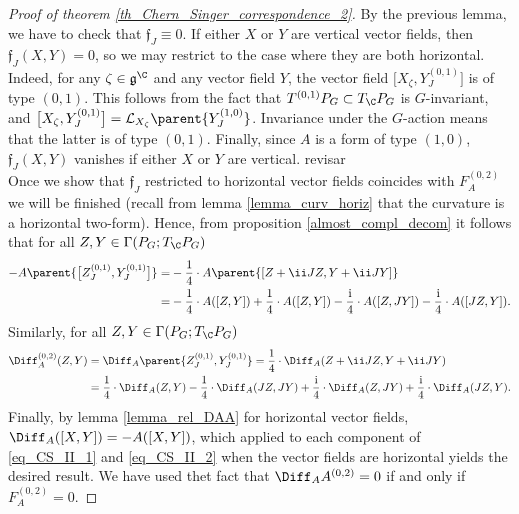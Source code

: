 \begin{proof}[\textit{Proof of theorem} \ref{th_Chern_Singer_correspondence_2}]
    By the previous lemma, we have to check that \(\mathfrak{f}_J \equiv 0\). If either \(X\) or \(Y\) are vertical vector fields, then \(\mathfrak{f}_J(X,Y)=0\), so we may restrict to the case where they are both horizontal. Indeed, for any \(\zeta \in \mathfrak{g}^\C\) and any vector field \(Y\), the vector field \(\big[X_{\zeta}, Y_J^{(0,1)}\big]\) is of type \((0,1)\). This follows from the fact that \(T^{(0,1)}P_G\subset T_\C P_G\) is \(G\)-invariant, and \(\big[X_{\zeta}, Y_J^{(0,1)}\big]=\mathcal{L}_{X_\zeta}\parent{Y_J^{(1,0)}}\). Invariance under the \(G\)-action means that the latter is of type \((0,1)\). Finally, since \(A\) is a form of type \((1,0)\), \(\mathfrak{f}_J(X,Y)\) vanishes if either \(X\) or \(Y\) are vertical. {\color{red} revisar }\\
    
    Once we show that \(\mathfrak{f}_J\) restricted to horizontal vector fields coincides with \(F_A^{(0,2)}\) we will be finished (recall from lemma \ref{lemma_curv_horiz} that the curvature is a horizontal two-form). Hence, from proposition \ref{almost_compl_decom} it follows that for all \(Z,Y \in \Gamma(P_G; T_\C P_G)\)
    \begin{equation} \label{eq_CS_II_1}
        \begin{split}
        -A\parent{\big[Z_J^{(0,1)}, Y_J^{(0,1)}\big]}  =& -\frac{1}{4}\cdot A\parent{[Z+\ii J Z, Y+\ii J Y ]} \\ 
        = & -\frac{1}{4}\cdot A([Z,Y])+\frac{1}{4}\cdot A([Z,Y]) - \frac{\mathrm{i}}{4}\cdot A([Z,JY]) - \frac{\mathrm{i}}{4} \cdot A([JZ, Y]).
        \end{split}
    \end{equation}
    Similarly, for all \(Z, Y \in \Gamma(P_G; T_\C P_G)\)
    \begin{equation} \label{eq_CS_II_2}
        \begin{split}
        \Diff_A^{(0,2)}(Z,Y) & = \Diff_A\parent{Z_J^{(0,1)}, Y_J^{(0,1)}}= \frac{1}{4}\cdot \Diff_A(Z+\ii J Z,Y+\ii JY) \\
        & = \frac{1}{4} \cdot \Diff_A(Z,Y)-\frac{1}{4} \cdot \Diff_A(JZ, JY) +\frac{\mathrm{i}}{4}\cdot \Diff_A(Z, JY) + \frac{\mathrm{i}}{4}\cdot \Diff_A(JZ, Y).
        \end{split}
    \end{equation}
    Finally, by lemma \ref{lemma_rel_DAA} for horizontal vector fields, \(\Diff_A([X,Y])=-A([X,Y])\), which applied to each component of \eqref{eq_CS_II_1} and \eqref{eq_CS_II_2} when the vector fields are horizontal yields the desired result. We have used thet fact that \(\Diff_AA^{(0,2)}=0\) if and only if \(F_A^{(0,2)}=0\). 
\end{proof}

